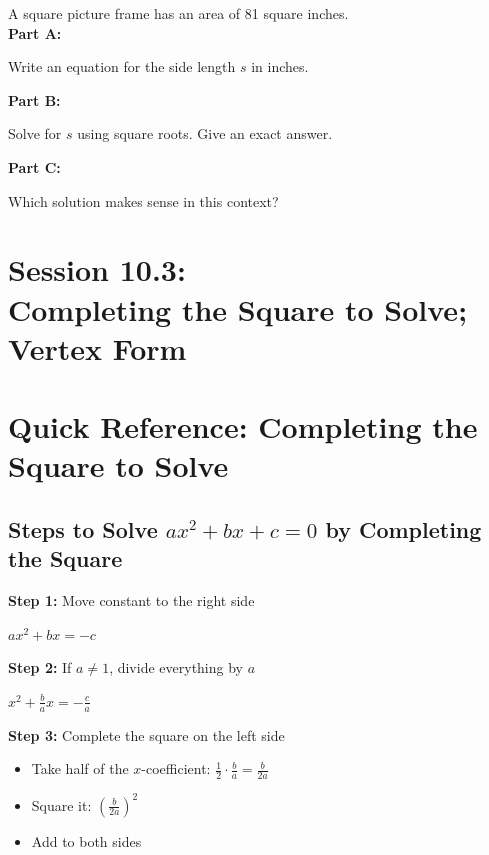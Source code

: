 \documentclass[12pt]{article}
\begin{document}
			A square picture frame has an area of 81 square inches.\\

			\textbf{Part A:}
            
            Write an equation for the side length $s$ in inches.

			\vspace{2cm}

			\textbf{Part B:}
            
            Solve for $s$ using square roots. Give an exact answer.

			\vspace{4cm}

			\textbf{Part C:}
            
            Which solution makes sense in this context?

			\newpage

	\section*{Session 10.3: \\ Completing the Square to Solve; Vertex Form}

	\section*{Quick Reference: Completing the Square to Solve}

		\subsection*{Steps to Solve $ax^2 + bx + c = 0$ by Completing the Square}

			\textbf{Step 1:} Move constant to the right side

			$ax^2 + bx = -c$

			\textbf{Step 2:} If $a \neq 1$, divide everything by $a$

			$x^2 + \frac{b}{a}x = -\frac{c}{a}$

			\textbf{Step 3:} Complete the square on the left side
			\begin{itemize}
				\item Take half of the $x$-coefficient: $\frac{1}{2} \cdot \frac{b}{a} = \frac{b}{2a}$
				\item Square it: $\left(\frac{b}{2a}\right)^2$
				\item Add to both sides
			\end{itemize}
\end{document}
